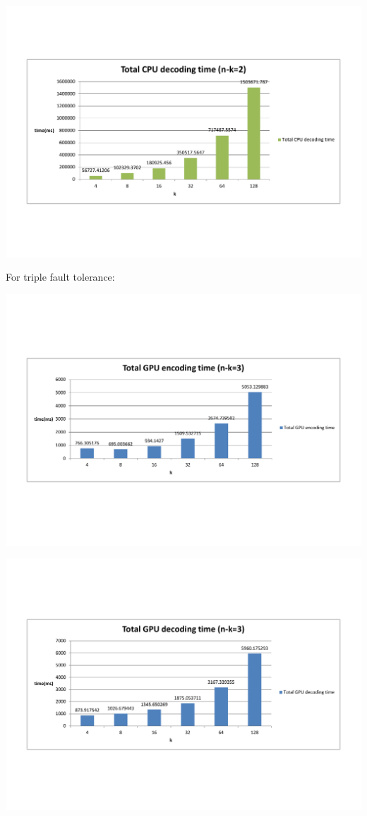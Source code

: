\documentclass[a4paper]{article}
\begin{document}
\includegraphics[scale=0.5]{result-graph/Total-CPU-decoding-time-2.pdf}

For triple fault tolerance:

\includegraphics[scale=0.5]{result-graph/Total-GPU-encoding-time-3.pdf}

\includegraphics[scale=0.5]{result-graph/Total-GPU-decoding-time-3.pdf}
\end{document}

